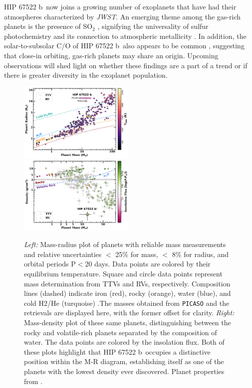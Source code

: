 \documentclass[twocolumn]{aastex63} %
\newcommand{\jwst}{\textit{JWST}}
\newcommand{\plname}{HIP 67522 b}
\begin{document}
\plname\, now joins a growing number of exoplanets that have had their atmospheres characterized by \jwst. An emerging theme among the gas-rich planets is the presence of SO$_2$ \citep{rustamkulov2023early,Dyrek2024}, signifying the universality of sulfur photochemistry and its connection to atmospheric metallicity \citep{Tsai2023}. In addition, the solar-to-subsolar C/O of \plname\, also appears to be common \citep{Alderson2023,August2023,Radica2023,Bell2023,Xue2024,Fu2024}, suggesting that close-in orbiting, gas-rich planets may share an origin. Upcoming observations will shed light on whether these findings are a part of a trend or if there is greater diversity in the exoplanet population. 

\begin{figure}[ht]
    \centering
    \includegraphics[width=0.495\textwidth]{mass_radius_rv_v1_final.pdf}
      \includegraphics[width=0.4950\textwidth]{mass_density_rv_v1.pdf}
    \caption{\textit{Left:} Mass-radius plot of planets with reliable mass measurements and relative uncertainties $<$ 25\% for mass, $<$ 8\% for radius, and orbital periods P$<$20 days. Data points are colored by their equilibrium temperature. Square and circle data points represent mass determination from TTVs and RVs, respectively. Composition lines (dashed) indicate iron (red), rocky (orange), water (blue), and cold H2/He (turquoise) \citep{zeng2019growth}.The masses obtained from \texttt{PICASO} and the retrievals are displayed here, with the former offset for clarity. \textit{Right: } Mass-density plot of these same planets, distinguishing between the rocky and volatile-rich planets separated by the composition of water. The data points are colored by the insolation flux. Both of these plots highlight that \plname\, occupies a distinctive position within the M-R diagram, establishing itself as one of the planets with the lowest density ever discovered. Planet properties from \citet{NASAexplanetarchive}. 
    \label{fig:mass_radius_lc}}
\end{figure} 
\end{document}
